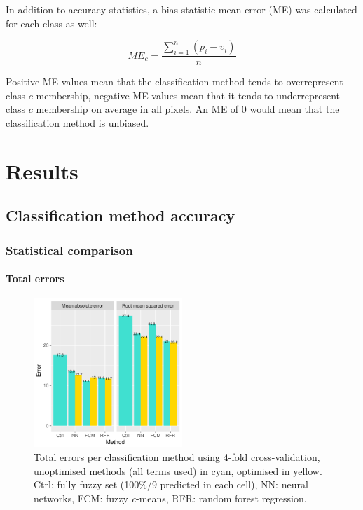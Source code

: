 \documentclass[a4paper,12pt]{scrbook}
\begin{document}
In addition to accuracy statistics, a bias statistic mean error (ME) was calculated for each class as well:

$$ ME_c = \frac{\displaystyle\sum_{i=1}^{n}{ (p_{i} - v_{i}) }}{n} $$

Positive ME values mean that the classification method tends to overrepresent class $c$ membership, negative ME values mean that it tends to underrepresent class $c$ membership on average in all pixels. An ME of 0 would mean that the classification method is unbiased.

\chapter{Results}

\section{Classification method accuracy}

\subsection{Statistical comparison}

\subsubsection{Total errors}

\begin{figure}
  \centering
  \includegraphics[width=0.5\textwidth]{thesis-figures/total-errors}
  \caption{Total errors per classification method using 4-fold cross-validation, unoptimised methods (all terms used) in cyan, optimised in yellow. Ctrl: fully fuzzy set (100\%/9 predicted in each cell), NN: neural networks, FCM: fuzzy \textit{c}-means, RFR: random forest regression.}
  \label{fig-total-errors}
\end{figure}
\end{document}
